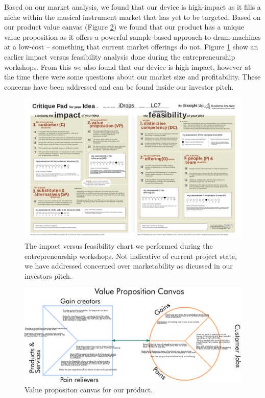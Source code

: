 \documentclass[11pt]{article}
\begin{document}
Based on our market analysis, we found that our device is high-impact
as it fills a niche within the musical instrument market that has yet
to be targeted. Based on our product value canvas (Figure \ref{fig:org5c053a1}) we
found that our product has a unique value proposition as it offers a
powerful sample-based approach to drum machines at a low-cost --
something that current market offerings do not. Figure \ref{fig:orgcf5c438} show
an earlier impact versus feasibility analysis done during the
entrepreneurship workshops. From this we also found that our device is
high impact, however at the time there were some questions about our
market size and profitability.  These concerns have been addressed and
can be found inside our investor pitch.

\newpage

\begin{figure}
\centering
\includegraphics[width=22cm]{./impact.png}
\caption{\label{fig:orgcf5c438}
The impact versus feasibility chart we performed during the entrepreneurship workshops. Not indicative of current project state, we have addressed concerned over marketability as dicussed in our investors pitch.}
\end{figure}

\newpage

\begin{figure}[htbp]
\centering
\includegraphics[width=15cm]{./pvc.png}
\caption{\label{fig:org5c053a1}
Value propositon canvas for our product.}
\end{figure}
\end{document}
